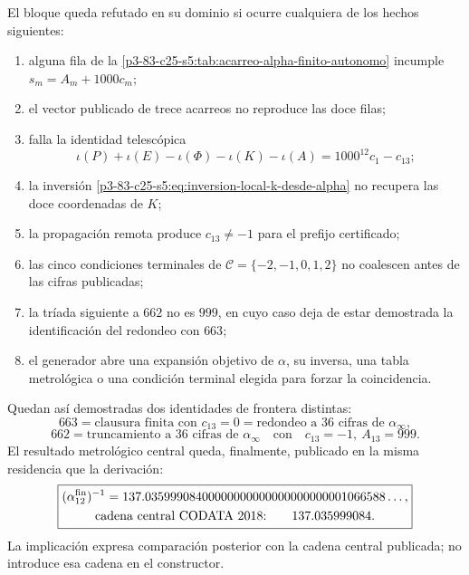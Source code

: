 \begin{remark}
El bloque queda refutado en su dominio si ocurre cualquiera de los hechos
siguientes:
\begin{enumerate}
 \item alguna fila de la \cref{p3-83-c25-s5:tab:acarreo-alpha-finito-autonomo}
       incumple \(s_m=A_m+1000c_m\);
 \item el vector publicado de trece acarreos no reproduce las doce filas;
 \item falla la identidad telescópica
       \[
       \iota(P)+\iota(E)-\iota(\Phi)-\iota(K)-\iota(A)
       =1000^{12}c_1-c_{13};
       \]
 \item la inversión \eqref{p3-83-c25-s5:eq:inversion-local-k-desde-alpha} no recupera
       las doce coordenadas de \(K\);
 \item la propagación remota produce \(c_{13}\neq-1\) para el prefijo
       certificado;
 \item las cinco condiciones terminales de
       \(\mathcal C=\{-2,-1,0,1,2\}\) no coalescen antes de las cifras
       publicadas;
 \item la tríada siguiente a \(662\) no es \(999\), en cuyo caso deja de
       estar demostrada la identificación del redondeo con \(663\);
 \item el generador abre una expansión objetivo de \(\alpha\), su inversa,
       una tabla metrológica o una condición terminal elegida para forzar
       la coincidencia.
\end{enumerate}
\end{remark}

Quedan así demostradas dos identidades de frontera distintas:
\[
 \boxed{
 663=\text{clausura finita con }c_{13}=0
     =\text{redondeo a 36 cifras de }\alpha_\infty,}
\]
\[
 \boxed{
 662=\text{truncamiento a 36 cifras de }\alpha_\infty
 \quad\text{con}\quad c_{13}=-1,\ A_{13}=999.}
\]
El resultado metrológico central queda, finalmente, publicado en la misma
residencia que la derivación:
\begin{equation}
 \boxed{
 \begin{gathered}
  (\alpha_{12}^{\rm fin})^{-1}
  =137.03599908400000000000000000000001066588\ldots,\\
  \text{cadena central CODATA 2018:}\qquad137.035999084.
 \end{gathered}}
 \label{p3-83-c25-s5:eq:resultado-final-alpha-codata-2018}
\end{equation}
La implicación expresa comparación posterior con la cadena central
publicada; no introduce esa cadena en el constructor.
